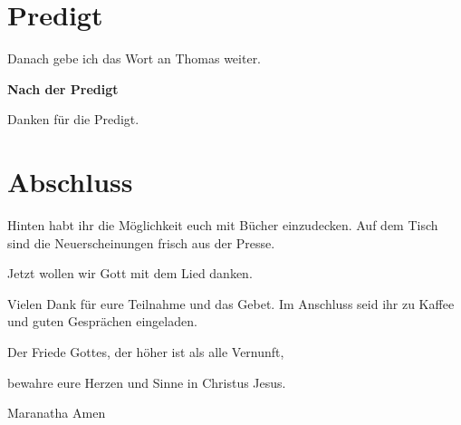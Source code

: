 \documentclass{../inc/mybib}
\begin{document}

\section{Predigt}

Danach gebe ich das Wort an Thomas weiter.

\textbf{Nach der Predigt}

Danken für die Predigt.


\section{Abschluss}
Hinten habt ihr die Möglichkeit euch mit Bücher einzudecken. Auf dem Tisch sind die Neuerscheinungen frisch aus der Presse.


Jetzt wollen wir Gott mit dem Lied  danken.


Vielen Dank für eure Teilnahme und das Gebet. Im Anschluss seid ihr zu Kaffee und guten Gesprächen eingeladen.
\beten{} 


Der Friede Gottes, der höher ist als alle Vernunft,

bewahre eure Herzen und Sinne in Christus Jesus.

Maranatha Amen
\end{document}
